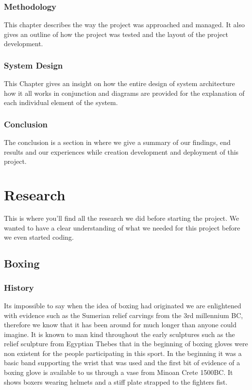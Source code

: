 \documentclass[a4paper,12pt]{report}
\begin{document}
\subsection{Methodology}
This chapter describes the way the project was approached and managed. It also gives an outline of how the project was tested and the layout of the project development.
\subsection{System Design}
This Chapter gives an insight on how the entire design of system architecture how it all works in conjunction and diagrams are provided for the explanation of each individual element of the system. 
\subsection{Conclusion}
The conclusion is a section in where we give a summary of our findings, end results and our experiences while creation development and deployment of this project.


\chapter{Research}
This is where you'll find all the research we did before starting the project. We wanted to have a clear understanding of what we needed for this project before we even started coding. 
\section{Boxing}
\subsection{History}
Its impossible to say when the idea of boxing had originated we are enlightened with evidence such as the Sumerian relief carvings from the 3rd millennium BC, therefore we know that it has been around for much longer than anyone could imagine.\newline
It is known to man kind throughout the early sculptures such as the relief sculpture from Egyptian Thebes that in the beginning of boxing gloves were non existent for the people participating in this sport.\newline
In the beginning it was a basic band supporting the wrist that was used and the first bit of evidence of a boxing glove is available to us through a vase from Minoan Crete 1500BC. It shows boxers wearing helmets and a stiff plate strapped to the fighters fist.
\cite{Boxing}
\end{document}
